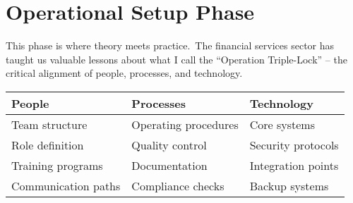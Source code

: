 
\section{Operational Setup Phase}\label{sec:operational-setup}

This phase is where theory meets practice.\ The financial services sector has taught us valuable lessons about what I call the ``Operation Triple-Lock'' – the critical alignment of people, processes, and technology.


\begin{tcolorbox}[colback=white,colframe=primarydark,title=\textbf{Operational Setup Matrix}]
\begin{center}
\begin{tabularx}{\textwidth}{>{\raggedright\arraybackslash}X >{\raggedright\arraybackslash}X >{\raggedright\arraybackslash}X}
    \toprule
    \textbf{People} & \textbf{Processes} & \textbf{Technology} \\
    \midrule
    Team structure & Operating procedures & Core systems \\
    Role definition & Quality control & Security protocols \\
    Training programs & Documentation & Integration points \\
    Communication paths & Compliance checks & Backup systems \\
    \bottomrule
\end{tabularx}
\end{center}
\end{tcolorbox}

